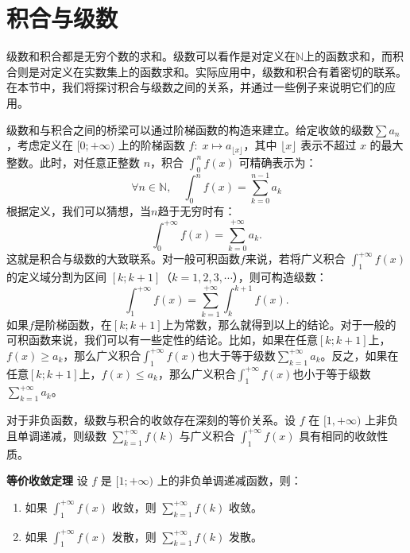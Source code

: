 \documentclass[12pt,UTF8]{ctexbook}
\begin{document}
\section{积合与级数}

级数和积合都是无穷个数的求和。级数可以看作是对定义在$\mathbb{N}$上的函数求和，而积合则是对定义在实数集上的函数求和。实际应用中，级数和积合有着密切的联系。在本节中，我们将探讨积合与级数之间的关系，并通过一些例子来说明它们的应用。

级数和与积合之间的桥梁可以通过阶梯函数的构造来建立。给定收敛的级数$\sum a_n$，考虑定义在 $[0;+\infty)$ 上的阶梯函数 $f:\; x\mapsto a_{\lfloor x \rfloor}$，其中 $\lfloor x \rfloor$ 表示不超过 $x$ 的最大整数。此时，对任意正整数 $n$，积合 $\int_0^{n} f(x) $ 可精确表示为：
\[
\forall n \in \mathbb{N},\quad
\int_0^{n} f(x) = \sum_{k=0}^{n-1} a_k
\]
根据定义，我们可以猜想，当$n$趋于无穷时有：
\[
\int_0^{+\infty} f(x) = \sum_{k=0}^{+\infty} a_k.
\]
这就是积合与级数的大致联系。对一般可积函数$f$来说，若将广义积合 $\int_1^{+\infty} f(x)$的定义域分割为区间 $[k; k+1]$（$k=1,2,3,\cdots$），则可构造级数：
\[
\int_1^{+\infty} f(x) = \sum_{k=1}^{+\infty} \int_k^{k+1} f(x).
\]
如果$f$是阶梯函数，在$[k;k+1]$上为常数，那么就得到以上的结论。对于一般的可积函数来说，我们可以有一些定性的结论。比如，如果在任意$[k;k+1]$上，$f(x) \geqslant a_k$，那么广义积合$\int_1^{+\infty} f(x)$也大于等于级数$\displaystyle\sum_{k=1}^{+\infty} a_k$。反之，如果在任意$[k;k+1]$上，$f(x) \leqslant a_k$，那么广义积合$\int_1^{+\infty} f(x)$也小于等于级数$\displaystyle\sum_{k=1}^{+\infty} a_k$。

对于非负函数，级数与积合的收敛存在深刻的等价关系。设 $f$ 在 $[1,+\infty)$ 上非负且单调递减，则级数 $\sum_{k=1}^{+\infty} f(k)$ 与广义积合 $\int_{1}^{+\infty} f(x)$ 具有相同的收敛性质。

\begin{tm}{\textbf{等价收敛定理}}
    设 $f$ 是 $[1;+\infty)$ 上的非负单调递减函数，则：
    \begin{enumerate}
        \item 如果 $\displaystyle\int_{1}^{+\infty} f(x)$ 收敛，则 $\displaystyle\sum_{k=1}^{+\infty} f(k)$ 收敛。
        \item 如果 $\displaystyle\int_{1}^{+\infty} f(x)$ 发散，则 $\displaystyle\sum_{k=1}^{+\infty} f(k)$ 发散。
    \end{enumerate}
    
\end{tm}
\end{document}
